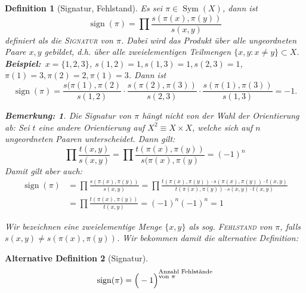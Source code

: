 \documentclass{report}
\newcommand{\IN}[1]{\index{#1|BH}}
\DeclareMathOperator{\Sym}{Sym}
\DeclareMathOperator{\sign}{sign}
\theoremstyle{customrem}
\newtheorem*{bemerkung}{Bemerkung\textnormal:}
\theoremstyle{customdef}
\newtheorem{definition}{Definition}[chapter]
\newtheorem{definitionnn}[definition]{Alternative Definition}
\newcommand{\defemph}[1]{\textsc{#1}}
\begin{document}
	\begin{definition}[Signatur, Fehlstand]
		\IN{Signatur}
		\IN{Fehlstand}
		Es sei $\pi\in\Sym(X)$, dann ist $$\sign(\pi)=\prod \frac{s(\pi(x), \pi(y))}{s(x, y)}$$ definiert als die \defemph{Signatur} von $\pi$. Dabei wird das Produkt über alle ungeordneten Paare $x,y$ gebildet, d.h. über alle zweielementigen Teilmengen $\{x,y:x\neq y\}\subset X$.\\
	
		\textbf{Beispiel:}\ $x=\{1,2,3\}$, $s(1,2)=1, s(1,3)=1, s(2,3)=1$, $\pi(1)=3, \pi(2)=2, \pi(1)=3$. Dann ist $$\sign(\pi)=\frac{s(\pi(1), \pi(2)}{s(1, 2)}\cdot \frac{s(\pi(2), \pi(3))}{s(2, 3)}\cdot\frac{s(\pi(1), \pi(3))}{s(1, 3)} = -1.$$
		
		\begin{bemerkung}
			Die Signatur von $\pi$ hängt nicht von der Wahl der Orientierung ab: Sei $t$ eine andere Orientierung auf $X^2\equiv X\times X$, welche sich auf $n$ ungeordneten Paaren unterscheidet. Dann gilt: 
			$$\prod\frac{t(x, y)}{s(x, y)}=\prod\frac{t(\pi(x), \pi(y))}{s(\pi(x), \pi(y)}=(-1)^n$$
			Damit gilt aber auch:
			\begin{align*}
				\sign(\pi) &= \prod\frac{s(\pi(x), \pi(y))}{s(x, y)} = \prod\frac{t(\pi(x), \pi(y))\cdot s(\pi(x), \pi(y))\cdot t(x, y)}{t(\pi(x), \pi(y))\cdot s(x, y)\cdot t(x, y)}\\&=\prod\frac{t(\pi(x), \pi(y))}{t(x, y)}=(-1)^n(-1)^n=1
			\end{align*}
		\end{bemerkung}
		
		
		Wir bezeichnen eine zweielementige Menge $\{x, y\}$ als sog. \defemph{Fehlstand} von $\pi$, falls $s(x, y)\neq s(\pi(x), \pi(y))$. Wir bekommen damit die alternative Definition:
	\end{definition}
	
	\begin{definitionnn}[Signatur]
		$$\sign(\pi) = \Big(-1\Big)^{\substack{\text{Anzahl Fehlstände}\\\text{von $\pi$\hspace{1.55cm}}}}$$
	\end{definitionnn}

\newpage
\renewcommand{\listtheoremname}{Satz- und Definitionsverzeichnis}
\listoftheorems[ignoreall, show={definition}, show={satz}, show={lemma}, show={definitionn}, show={korrolar}, show={definitionnn}]
\newpage
\printindex
\end{document}
